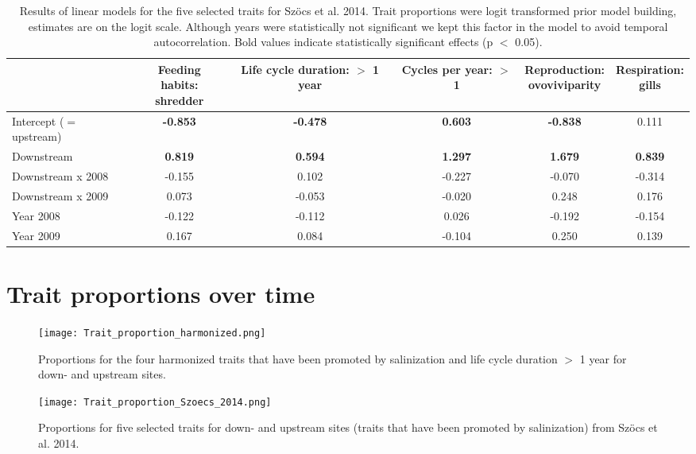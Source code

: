 \documentclass[../Draft_harmonization_paper.tex]{subfiles}
\begin{document}
\begin{table}[ht]
    \centering
    \caption{Results of linear models for the five selected traits for Szöcs et al. 2014. Trait proportions were logit transformed prior model building, estimates are on the logit scale.
    Although years were statistically not significant we kept this factor in the model to avoid temporal autocorrelation. Bold values indicate statistically
    significant effects (p $<$ 0.05).}
    \label{stab:linear_models_edi}
    \begin{tabular}{l|ccccc}
    \toprule[.1em]
    & \specialcell{Feeding habits:\\ shredder} & \specialcell{Life cycle duration:\\ $>$ 1 year} & \specialcell {Cycles per year:\\ $>$ 1} & \specialcell{Reproduction:\\ ovoviviparity} & \specialcell{Respiration:\\ gills} \\ 
    \toprule[.1em]
    Intercept ($=$ upstream) & \textbf{-0.853} & \textbf{-0.478} & \textbf{0.603} & \textbf{-0.838} & 0.111 \\ 
    Downstream & \textbf{0.819} & \textbf{0.594} & \textbf{1.297} & \textbf{1.679} & \textbf{0.839} \\ 
    Downstream x 2008 & -0.155 & 0.102 & -0.227 & -0.070 & -0.314 \\ 
    Downstream x 2009 & 0.073 & -0.053 & -0.020 & 0.248 & 0.176 \\ 
    Year 2008 & -0.122 & -0.112 & 0.026 & -0.192 & -0.154 \\ 
    Year 2009 & 0.167 & 0.084 & -0.104 & 0.250 & 0.139 \\ 
    \bottomrule
    \end{tabular} 
\end{table}


\section*{Trait proportions over time}
\begin{figure}[H]
    \centering
    \texttt{[image: Trait\_proportion\_harmonized.png]}
    \caption{Proportions for the four harmonized traits that have been promoted by salinization and life cycle duration $>$ 1 year for down- and upstream sites.
    } 
\end{figure}

\begin{figure}[H]
    \centering
    \texttt{[image: Trait\_proportion\_Szoecs\_2014.png]}
    \caption{Proportions for five selected traits for down- and upstream sites (traits that have been promoted by salinization) from Szöcs et al. 2014.} 
\end{figure}
\end{document}
